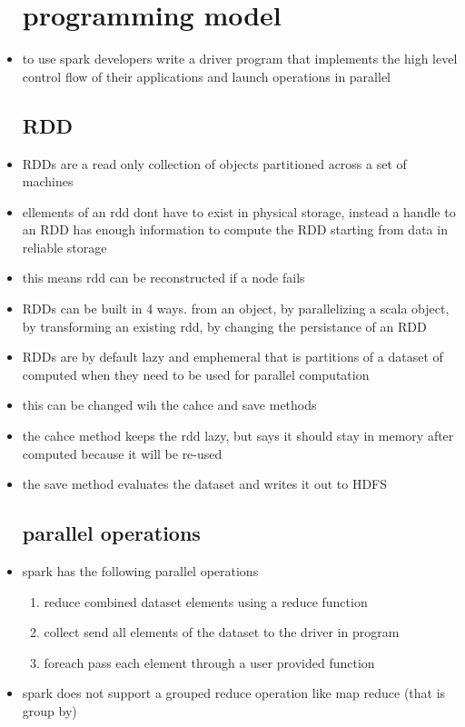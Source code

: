 \documentclass{article}
\begin{document}
\begin{itemize}
\section*{programming model}
\item to use spark developers write a driver program that implements the high level control flow of their applications and launch operations in parallel
\subsection*{RDD}
\item RDDs are a read only collection of objects partitioned across a set of machines
\item ellements of an rdd dont have to exist in physical storage, instead a handle to an RDD has enough information to compute the RDD starting from data in reliable storage
\item this means rdd can be reconstructed if a node fails
\item RDDs can be built in 4 ways. from an object, by parallelizing a scala object, by transforming an existing rdd, by changing the persistance of an RDD
\item RDDs are by default lazy and emphemeral that is partitions of a dataset of computed  when they need to be used for parallel computation
\item this can be changed wih the cahce and save methods 
\item the cahce method keeps the rdd lazy, but  says it should stay in memory after computed because it will be re-used
\item the save method evaluates the dataset and writes it out to HDFS
\subsection*{parallel operations}
\item spark has the following parallel operations
\begin{enumerate}
    \item reduce combined dataset elements using a reduce function
    \item collect send all elements of the dataset to the driver in program
    \item foreach pass each element through a user provided function 
\end{enumerate}
\item spark does not support a grouped reduce operation like map reduce (that is group by)

\end{itemize}
\end{document}
